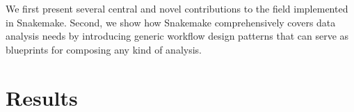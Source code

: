 \documentclass{scrartcl}
\begin{document}
We first present several central and novel contributions to the field implemented in Snakemake.
Second, we show how Snakemake comprehensively covers data analysis needs by introducing generic workflow design patterns that can serve as blueprints for composing any kind of analysis.

\section{Results}

\printbibliography
\end{document}
